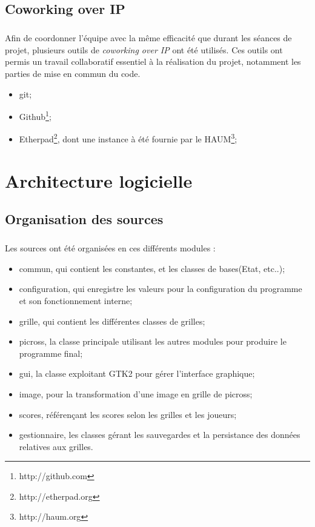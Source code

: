 \section{Coworking over IP}
        \paragraph*{}
         Afin de coordonner l'équipe avec la même efficacité que durant les séances de projet, plusieurs outils de \textit{coworking over IP} ont  été utilisés.
Ces outils ont permis un travail collaboratif essentiel à la réalisation du projet, notamment les parties de mise en commun du code.
        \begin{itemize}
                \item git;
                \item Github\footnote{http://github.com};
                \item Etherpad\footnote{http://etherpad.org}, dont une instance à été fournie par le HAUM\footnote{http://haum.org};
        \end{itemize}






\chapter{Architecture logicielle}


\section{Organisation des sources}
        \paragraph*{}
   Les sources ont été organisées en ces différents modules :
    \begin{itemize}
             \item commun, qui contient les constantes, et les classes de bases(Etat, etc..);
             \item configuration, qui enregistre les valeurs pour la configuration du programme et son fonctionnement interne;
             \item grille, qui contient les différentes classes de grilles;
             \item picross, la classe principale utilisant les autres modules pour produire le programme final;
             \item gui, la classe exploitant GTK2 pour gérer l'interface graphique;
             \item image, pour la transformation d'une image en grille de picross;
             \item scores, référençant les scores selon les grilles et les joueurs;
             \item gestionnaire, les classes gérant les sauvegardes et la persistance des données relatives aux grilles. %
        \end{itemize}
        
